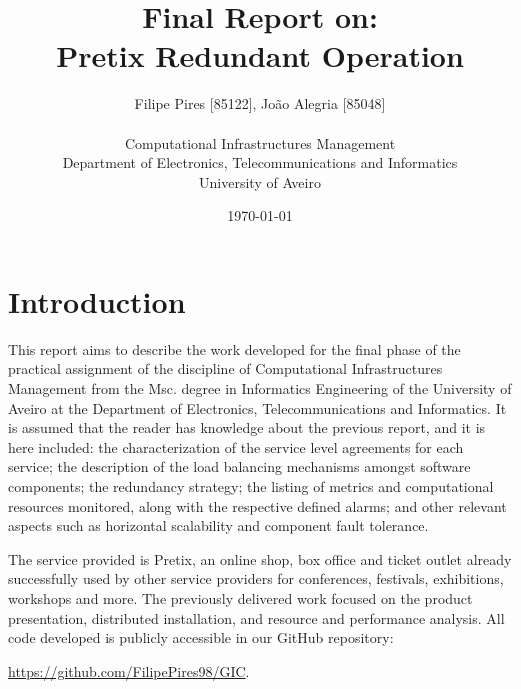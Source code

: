 \documentclass[12pt]{article}
\title{Final Report on:\\Pretix Redundant Operation}
\author
{Filipe Pires [85122], João Alegria [85048]\\
\\
Computational Infrastructures Management\\
\normalsize{Department of Electronics, Telecommunications and Informatics}\\
\normalsize{University of Aveiro}\\
}
\date{\today{}}
\begin{document}
\baselineskip18pt

\maketitle

\section*{Introduction} \label{introduction} %

This report aims to describe the work developed for the final phase of the practical assignment of the discipline of Computational Infrastructures
Management \cite{assign} from the Msc. degree in Informatics Engineering of the University of Aveiro at the Department of Electronics, Telecommunications and
Informatics.
It is assumed that the reader has knowledge about the previous report, and it is here included:
the characterization of the service level agreements for each service;
the description of the load balancing mechanisms amongst software components;
the redundancy strategy;
the listing of metrics and computational resources monitored, along with the respective defined alarms;
and other relevant aspects such as horizontal scalability and component fault tolerance.

The service provided is Pretix, an online shop, box office and ticket outlet already successfully used by other service providers for conferences, festivals,
exhibitions, workshops and more.
The previously delivered work focused on the product presentation, distributed installation, and resource and performance analysis.
All code developed is publicly accessible in our GitHub repository:

\url{https://github.com/FilipePires98/GIC}.



\end{document}

